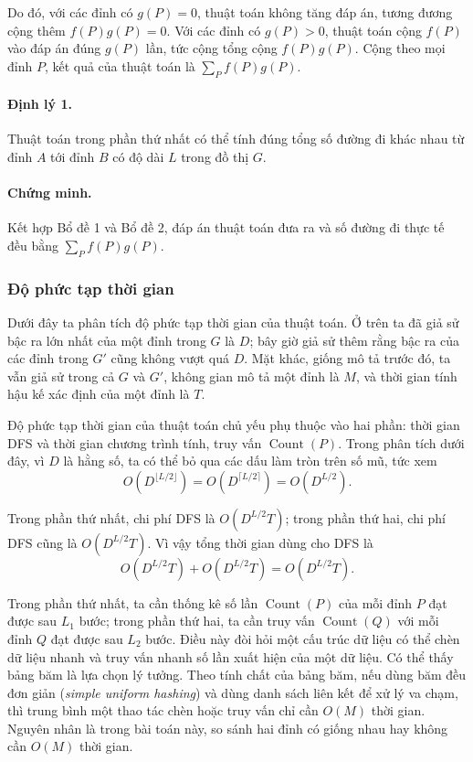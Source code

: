 \documentclass[11pt]{article}
\begin{document}
Do đó, với các đỉnh có \(g(P)=0\), thuật toán không tăng đáp án, tương đương
cộng thêm \(f(P)g(P)=0\). Với các đỉnh có \(g(P)>0\), thuật toán cộng
\(f(P)\) vào đáp án đúng \(g(P)\) lần, tức cộng tổng cộng \(f(P)g(P)\). Cộng
theo mọi đỉnh \(P\), kết quả của thuật toán là \(\sum_P f(P)g(P)\).

\paragraph{Định lý 1.}
Thuật toán trong phần thứ nhất có thể tính đúng tổng số đường đi khác nhau từ
đỉnh \(A\) tới đỉnh \(B\) có độ dài \(L\) trong đồ thị \(G\).

\paragraph{Chứng minh.}
Kết hợp Bổ đề 1 và Bổ đề 2, đáp án thuật toán đưa ra và số đường đi thực tế
đều bằng \(\sum_P f(P)g(P)\).

\subsubsection{Độ phức tạp thời gian}

Dưới đây ta phân tích độ phức tạp thời gian của thuật toán. Ở trên ta đã giả
sử bậc ra lớn nhất của một đỉnh trong \(G\) là \(D\); bây giờ giả sử thêm
rằng bậc ra của các đỉnh trong \(G'\) cũng không vượt quá \(D\). Mặt khác,
giống mô tả trước đó, ta vẫn giả sử trong cả \(G\) và \(G'\), không gian mô
tả một đỉnh là \(M\), và thời gian tính hậu kế xác định của một đỉnh là
\(T\).

Độ phức tạp thời gian của thuật toán chủ yếu phụ thuộc vào hai phần: thời
gian DFS và thời gian chương trình tính, truy vấn \(\operatorname{Count}(P)\).
Trong phân tích dưới đây, vì \(D\) là hằng số, ta có thể bỏ qua các dấu làm
tròn trên số mũ, tức xem
\[
  O(D^{\lfloor L/2\rfloor})
  =O(D^{\lceil L/2\rceil})
  =O(D^{L/2}).
\]

Trong phần thứ nhất, chi phí DFS là \(O(D^{L/2}T)\); trong phần thứ hai, chi
phí DFS cũng là \(O(D^{L/2}T)\). Vì vậy tổng thời gian dùng cho DFS là
\[
  O(D^{L/2}T)+O(D^{L/2}T)=O(D^{L/2}T).
\]

Trong phần thứ nhất, ta cần thống kê số lần
\(\operatorname{Count}(P)\) của mỗi đỉnh \(P\) đạt được sau \(L_1\) bước; trong
phần thứ hai, ta cần truy vấn \(\operatorname{Count}(Q)\) với mỗi đỉnh \(Q\)
đạt được sau \(L_2\) bước. Điều này đòi hỏi một cấu trúc dữ liệu có thể chèn
dữ liệu nhanh và truy vấn nhanh số lần xuất hiện của một dữ liệu. Có thể thấy
bảng băm là lựa chọn lý tưởng. Theo tính chất của bảng băm, nếu dùng băm đều
đơn giản (\emph{simple uniform hashing}) và dùng danh sách liên kết để xử lý
va chạm, thì trung bình một thao tác chèn hoặc truy vấn chỉ cần \(O(M)\) thời
gian. Nguyên nhân là trong bài toán này, so sánh hai đỉnh có giống nhau hay
không cần \(O(M)\) thời gian.
\end{document}
